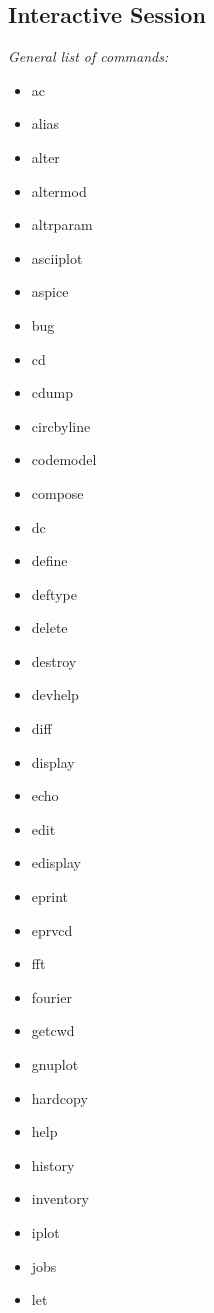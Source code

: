 \subsection*{Interactive Session}

\textit{General list of commands:}\\
{\footnotesize \begin{multicols}{4}\begin{itemize}[leftmargin=0,label={}]
    \item ac
    \item alias
    \item alter
    \item altermod
    \item alt\textquotesingle rparam
    \item asciiplot
    \item aspice
    \item bug
    \item cd
    \item cdump
    \item circbyline
    \item codemodel
    \item compose
    \item dc
    \item define
    \item deftype
    \item delete
    \item destroy
    \item devhelp
    \item diff
    \item display
    \item echo
    \item edit
    \item edisplay
    \item eprint
    \item eprvcd
    \item fft
    \item fourier
    \item getcwd
    \item gnuplot
    \item hardcopy
    \item help
    \item history
    \item inventory
    \item iplot
    \item jobs
    \item let

\end{itemize}
\end{multicols}}
